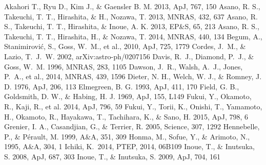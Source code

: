 \begin{thebibliography}{99}
\begin{multicols}{2}{\footnotesize
{}
	Akahori T., Ryu D., Kim J., \& Gaensler B. M. 2013, ApJ, 767, 150
	Asano, R. S., Takeuchi, T. T., Hirashita, \& H., Nozawa, T. 2013, MNRAS, 432, 637
	Asano, R. S., Takeuchi, T. T., Hirashita, \& Inoue, A. K. 2013, EP\&S, 65, 213
	Asano, R. S., Takeuchi, T. T., Hirashita, H., \& Nozawa, T. 2014, MNRAS, 440, 134
	Begum, A., Stanimirovi{\'c}, S., Goss, W.~M., et al., 2010, ApJ, 725, 1779
	Cordes, J.~M., \& Lazio, T.~J.~W. 2002, arXiv:astro-ph/0207156
	Davis, R.~J., Diamond, P.~J., \& Goss, W.~M. 1996, MNRAS, 283, 1105
	Dawson, J.~R., Walsh, A.~J., Jones, P.~A., et al., 2014, MNRAS, 439, 1596
	Dieter, N. H., Welch, W. J., \& Romney, J. D. 1976, ApJ, 206, 113
	Elmegreen, B. G. 1993, ApJ, 411, 170
	Field, G. B., Goldsmith, D. W., \& Habing, H. J. 1969, ApJ, 155, L149
	Fukui, Y., Okamoto, R., Kaji, R., et al. 2014, ApJ, 796, 59
	Fukui, Y., Torii, K., Onishi, T., Yamamoto, H., Okamoto, R., Hayakawa, T., Tachihara, K., \& Sano, H. 2015, ApJ, 798, 6
	Grenier, I. A., Casandjian, G., \& Terrier, R. 2005, Science, 307, 1292
	Hennebelle, P., \& P\'erault, M. 1999, A\&A, 351, 309
	Honma, M., Sofue, Y., \& Arimoto, N., 1995, A\&A, 304, 1
	Ichiki, K.\ 2014, PTEP, 2014, 06B109
	Inoue, T., \& Inutsuka, S. 2008, ApJ, 687, 303
	Inoue, T., \& Inutsuka, S. 2009, ApJ, 704, 161
}
\end{multicols}
\end{thebibliography}
